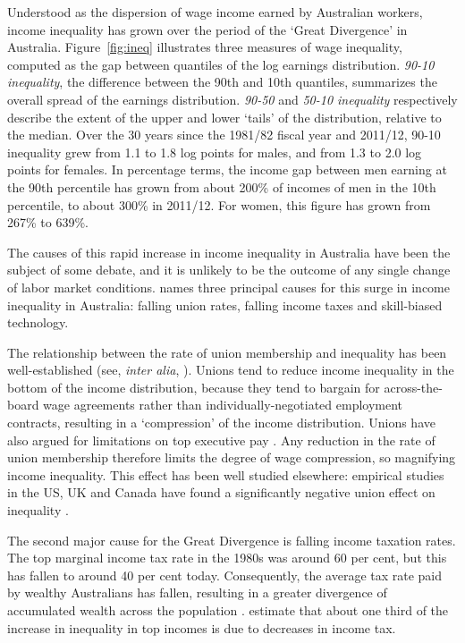 Understood as the dispersion of wage income earned by Australian workers, income inequality has grown over the period of the `Great Divergence' in Australia. Figure~\ref{fig:ineq} illustrates three measures of wage inequality, computed as the gap between quantiles of the log earnings distribution. {\em 90-10 inequality}, the difference between the 90th and 10th quantiles, summarizes the overall spread of the earnings distribution. {\em 90-50} and {\em 50-10 inequality} respectively describe the extent of the upper and lower `tails' of the distribution, relative to the median. Over the 30 years since the 1981/82 fiscal year and 2011/12, 90-10 inequality grew from 1.1 to 1.8 log points for males, and from 1.3 to 2.0 log points for females. In percentage terms, the income gap between men earning at the 90th percentile has grown from about 200\% of incomes of men in the 10th percentile, to about 300\% in 2011/12. For women, this figure has grown from 267\% to 639\%.


The causes of this rapid increase in income inequality in Australia have been the subject of some debate, and it is unlikely to be the outcome of any single change of labor market conditions. \citep{Leigh2013} names three principal causes for this surge in income inequality in Australia: falling union rates, falling income taxes and skill-biased technology. 

The relationship between the rate of union membership and inequality has been well-established (see, {\em inter alia}, \cite{Borland1996}).  Unions tend to reduce income inequality in the bottom of the income distribution, because they tend to bargain for across-the-board wage agreements rather than individually-negotiated employment contracts, resulting in a `compression' of the income distribution. Unions have also argued for limitations on top executive pay \citep{Davis2009}. Any reduction in the rate of union membership therefore limits the degree of wage compression, so magnifying income inequality. This effect has been well studied elsewhere: empirical studies in the US, UK and Canada have found a significantly negative union effect on inequality \citep{Card2004,Firpo2009}. 

The second major cause for the Great Divergence is falling income taxation rates. The top marginal income tax rate in the 1980s was around 60 per cent, but this has fallen to around 40 per cent today. Consequently, the average tax rate paid by wealthy Australians has fallen, resulting in a greater divergence of accumulated wealth across the population \citet[p31]{Leigh2013}. \citet{Atkinson2013} estimate that about one third of the increase in inequality in top incomes is due to decreases in income tax.

